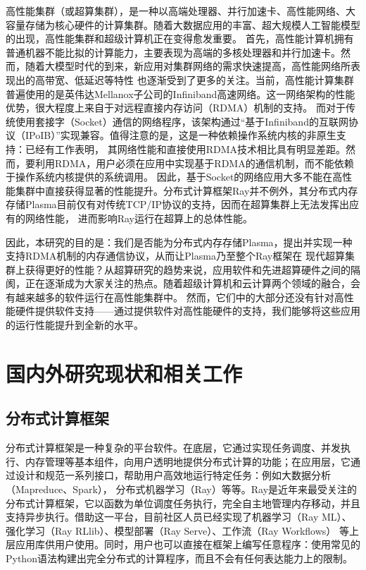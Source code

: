 高性能集群（或超算集群），是一种以高端处理器、并行加速卡、高性能网络、大容量存储为核心硬件的计算集群。随着大数据应用的丰富、超大规模人工智能模型的出现，高性能集群和超级计算机正在变得愈发重要。
首先，高性能计算机拥有普通机器不能比拟的计算能力，主要表现为高端的多核处理器和并行加速卡。然而，随着大模型时代的到来，新应用对集群网络的需求快速提高，高性能网络所表现出的高带宽、低延迟等特性
也逐渐受到了更多的关注。当前，高性能计算集群普遍使用的是英伟达Mellanox子公司的Infiniband高速网络\cite{pfister2001introduction}。这一网络架构的性能优势，很大程度上来自于对远程直接内存访问（RDMA）机制的支持。
而对于传统使用套接字（Socket）通信的网络程序，该架构通过“基于Infiniband的互联网协议（IPoIB）”实现兼容。值得注意的是，这是一种依赖操作系统内核的非原生支持：已经有工作\cite{mitchell2013using}表明，
其网络性能和直接使用RDMA技术相比具有明显差距。然而，要利用RDMA，用户必须在应用中实现基于RDMA的通信机制，而不能依赖于操作系统内核提供的系统调用。
因此，基于Socket的网络应用大多不能在高性能集群中直接获得显著的性能提升。分布式计算框架Ray并不例外，其分布式内存存储Plasma目前仅有对传统TCP/IP协议的支持，因而在超算集群上无法发挥出应有的网络性能，
进而影响Ray运行在超算上的总体性能。

因此，本研究的目的是：我们是否能为分布式内存存储Plasma，提出并实现一种支持RDMA机制的内存通信协议，从而让Plasma乃至整个Ray框架在
现代超算集群上获得更好的性能？从超算研究的趋势来说，应用软件和先进超算硬件之间的隔阂，正在逐渐成为大家关注的热点。随着超级计算机和云计算两个领域的融合，会有越来越多的软件运行在高性能集群中。
然而，它们中的大部分还没有针对高性能硬件提供软件支持——通过提供软件对高性能硬件的支持，我们能够将这些应用的运行性能提升到全新的水平。

\section{国内外研究现状和相关工作}
\label{sec:related_work}

\subsection{分布式计算框架}

分布式计算框架是一种复杂的平台软件。在底层，它通过实现任务调度、并发执行、内存管理等基本组件，向用户透明地提供分布式计算的功能；在应用层，它通过设计和规范一系列接口，帮助用户高效地运行特定任务：例如大数据分析（Mapreduce、Spark），
分布式机器学习（Ray）等等。Ray是近年来最受关注的分布式计算框架，它以函数为单位调度任务执行，完全自主地管理内存移动，并且支持异步执行。借助这一平台，目前社区人员已经实现了机器学习（Ray ML）、强化学习（Ray RLlib）、模型部署（Ray Serve）、工作流（Ray Workflows）
等上层应用库\cite{ray}供用户使用。同时，用户也可以直接在框架上编写任意程序：使用常见的Python语法构建出完全分布式的计算程序，而且不会有任何表达能力上的限制。

